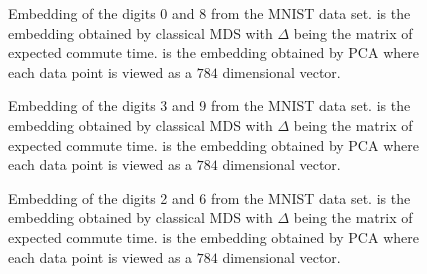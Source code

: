 \begin{figure}[htbp]
  \begin{center}
  \caption{Embedding of the digits 0 and 8 from the MNIST data
    set.  is the embedding obtained by
    classical MDS with $\Delta$ being the matrix of expected commute
    time.  is the embedding obtained by
    PCA where each data point is viewed as a $784$ dimensional vector.
    }
  \label{fig:mnist08}
  \end{center}
\end{figure}    

\begin{figure}[htbp]
  \begin{center}
  \caption{Embedding of the digits 3 and 9 from the MNIST data
    set.  is the embedding obtained by
    classical MDS with $\Delta$ being the matrix of expected commute
    time.  is the embedding obtained by
    PCA where each data point is viewed as a $784$ dimensional vector.
    }
  \label{fig:mnist39}
  \end{center}
\end{figure}    

\begin{figure}[htbp]
  \begin{center}
  \caption{Embedding of the digits 2 and 6 from the MNIST data
    set.  is the embedding obtained by
    classical MDS with $\Delta$ being the matrix of expected commute
    time.  is the embedding obtained by
    PCA where each data point is viewed as a $784$ dimensional vector.
    }
  \label{fig:mnist26}
  \end{center}
\end{figure}    

